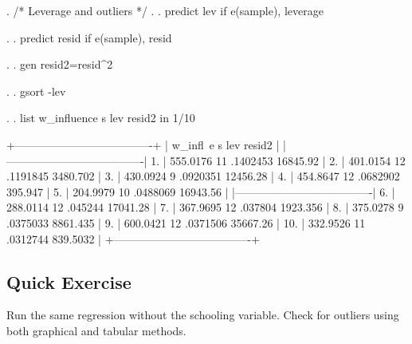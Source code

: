 \documentclass[12pt]{article}
\begin{document}
\begin{stlog}
. /* Leverage and outliers  */
.   
. predict lev if e(sample), leverage

. 
. predict resid if e(sample), resid

. 
. gen  resid2=resid^2

. 
. gsort -lev

. 
. list w_influence s lev resid2 in 1/10

     +-------------------------------------+
     | w_infl~e    s        lev     resid2 |
     |-------------------------------------|
  1. | 555.0176   11   .1402453   16845.92 |
  2. | 401.0154   12   .1191845   3480.702 |
  3. | 430.0924    9   .0920351   12456.28 |
  4. | 454.8647   12   .0682902    395.947 |
  5. | 204.9979   10   .0488069   16943.56 |
     |-------------------------------------|
  6. | 288.0114   12    .045244   17041.28 |
  7. | 367.9695   12    .037804   1923.356 |
  8. | 375.0278    9   .0375033   8861.435 |
  9. | 600.0421   12   .0371506   35667.26 |
 10. | 332.9526   11   .0312744   839.5032 |
     +-------------------------------------+
\end{stlog}

\subsection{Quick Exercise}

Run the same regression without the schooling variable. Check for
outliers using both graphical and tabular methods. 
\end{document}
